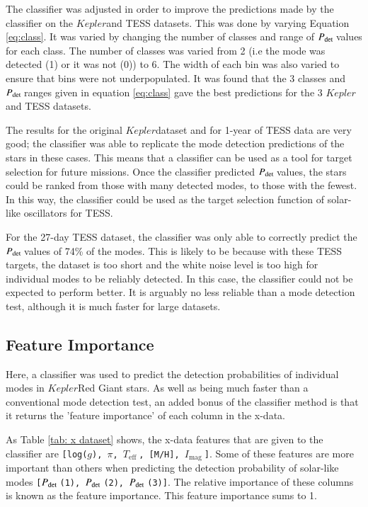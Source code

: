 \documentclass[a4paper,fleqn,usenatbib,useAMS]{mnras}
\newcommand{\teff}{\ensuremath{T_{\textrm{eff}}\:}}
\newcommand{\kep}{\ensuremath{Kepler}\:}
\newcommand{\pdet}{\ensuremath{P_{\rm det}\:}}
\newcommand{\imag}{\ensuremath{I_{\textrm{mag}}\:}}
\begin{document}
The classifier was adjusted in order to improve the predictions made by the classifier on the \kep and TESS datasets. This was done by varying Equation \ref{eq:class}. It was varied by changing the number of classes and range of \pdet values for each class. The number of classes was varied from 2 (i.e the mode was detected (1) or it was not (0)) to 6. The width of each bin was also varied to ensure that bins were not underpopulated. It was found that the 3 classes and \pdet ranges given in equation \ref{eq:class} gave the best predictions for the 3 \kep and TESS datasets. 

The results for the original \kep dataset and for 1-year of TESS data are very good; the classifier was able to replicate the mode detection predictions of the stars in these cases. This means that a classifier can be used as a tool for target selection for future missions. Once the classifier predicted \pdet values, the stars could be ranked from those with many detected modes, to those with the fewest. In this way, the classifier could be used as the target selection function of solar-like oscillators for TESS. 

For the 27-day TESS dataset, the classifier was only able to correctly predict the \pdet values of 74\% of the modes. This is likely to be because with these TESS targets, the dataset is too short and the white noise level is too high for individual modes to be reliably detected. In this case, the classifier could not be expected to perform better. It is arguably no less reliable than a mode detection test, although it is much faster for large datasets. 


\subsection{Feature Importance}
\label{sect: feature importance}

Here, a classifier was used to predict the detection probabilities of individual modes in \kep Red Giant stars. As well as being much faster than a conventional mode detection test, an added bonus of the classifier method is that it returns the 'feature importance' of each column in the x-data.

As Table \ref{tab: x dataset} shows, the x-data features that are given to the classifier are \texttt{[log($g$), $\pi$, \teff, [M/H], \imag]}. Some of these features are more important than others when predicting the detection probability of solar-like modes \texttt{[\pdet(1), \pdet(2), \pdet(3)]}. The relative importance of these columns is known as the feature importance. This feature importance sums to 1.
\end{document}
